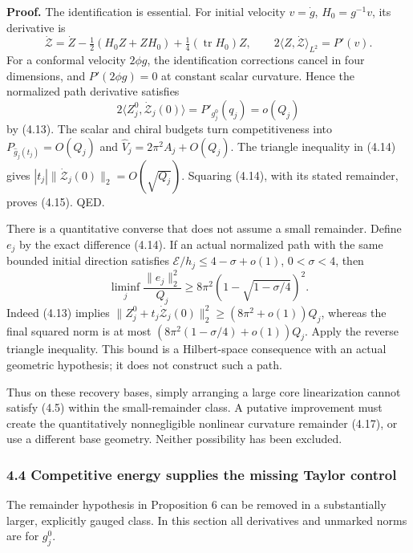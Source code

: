 \documentclass[
  10pt,
]{article}
\begin{document}
\textbf{Proof.} The identification is essential. For initial velocity
\(v=\dot g\), \(H_0=g^{-1}v\), its derivative is \[
 \dot{\mathcal Z}
   =\dot Z-\tfrac12(H_0Z+ZH_0)
                   +\tfrac14(\operatorname{tr}H_0)Z,\qquad
 2\langle Z,\dot{\mathcal Z}\rangle_{L^2}=P'(v). \tag{4.16}
\] For a conformal velocity \(2\phi g\), the identification corrections
cancel in four dimensions, and \(P'(2\phi g)=0\) at constant scalar
curvature. Hence the normalized path derivative satisfies \[
 2\langle Z_j^0,\dot{\mathcal Z}_j(0)\rangle
   =P'_{g_j^0}(q_j)=o(Q_j)
\] by (4.13). The scalar and chiral budgets turn competitiveness into
\(P_{\widehat g_j(t_j)}=O(Q_j)\) and \(\widehat V_j=2\pi^2A_j+O(Q_j)\).
The triangle inequality in (4.14) gives
\(|t_j|\|\dot{\mathcal Z}_j(0)\|_2=O(\sqrt{Q_j})\). Squaring (4.14),
with its stated remainder, proves (4.15). QED.

There is a quantitative converse that does not assume a small remainder.
Define \(e_j\) by the exact difference (4.14). If an actual normalized
path with the same bounded initial direction satisfies
\(\mathcal E/h_j\le4-\sigma+o(1)\), \(0<\sigma<4\), then \[
 \boxed{\liminf_j\frac{\|e_j\|_2^2}{Q_j}
 \ge8\pi^2\left(1-\sqrt{1-\sigma/4}\right)^2.} \tag{4.17}
\] Indeed (4.13) implies
\(\|Z_j^0+t_j\dot{\mathcal Z}_j(0)\|_2^2 \ge(8\pi^2+o(1))Q_j\), whereas
the final squared norm is at most \((8\pi^2(1-\sigma/4)+o(1))Q_j\).
Apply the reverse triangle inequality. This bound is a Hilbert-space
consequence with an actual geometric hypothesis; it does not construct
such a path.

Thus on these recovery bases, simply arranging a large core
linearization cannot satisfy (4.5) within the small-remainder class. A
putative improvement must create the quantitatively nonnegligible
nonlinear curvature remainder (4.17), or use a different base geometry.
Neither possibility has been excluded.

\hypertarget{competitive-energy-supplies-the-missing-taylor-control}{%
\subsubsection{4.4 Competitive energy supplies the missing Taylor
control}\label{competitive-energy-supplies-the-missing-taylor-control}}

The remainder hypothesis in Proposition 6 can be removed in a
substantially larger, explicitly gauged class. In this section all
derivatives and unmarked norms are for \(g_j^0\).
\end{document}
